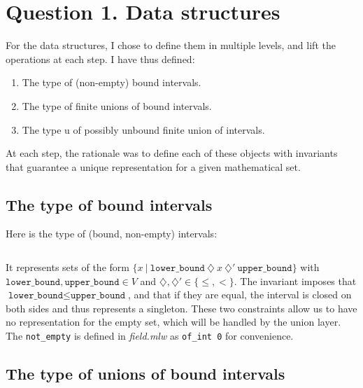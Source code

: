 \section{Question 1. Data structures}

For the data structures, I chose to define them in multiple levels, and lift the
operations at each step. I have thus defined:
%
\begin{enumerate}
  \item The type of (non-empty) bound intervals.
  \item The type of finite unions of bound intervals.
  \item The type u of possibly unbound finite union of intervals.
\end{enumerate}
%
At each step, the rationale was to define each of these objects with invariants that
guarantee a unique representation for a given mathematical set.
%

\subsection{The type of bound intervals}
Here is the type of (bound, non-empty) intervals:
\inputminted{\whyml}{why3code/interval_type.mlw}
%
It represents sets of the form
$\{ x ~|~ \texttt{lower\_bound}~\diamondsuit~x~\diamondsuit'~\texttt{upper\_bound} \}$
with
$\texttt{lower\_bound}, \texttt{upper\_bound} \in V$ and
$\diamondsuit, \diamondsuit' \in \{ \le, < \}$.
%
The invariant imposes that $\texttt{lower\_bound} \le \texttt{upper\_bound}$,
%
and that if they are equal, the interval is closed on both sides and thus represents
a singleton. These two constraints allow us to have no representation for the empty
set, which will be handled by the union layer.
%
The \texttt{not_empty} is defined in \textit{field.mlw} as
\texttt{of\_int 0} for convenience.

\subsection{The type of unions of bound intervals}

